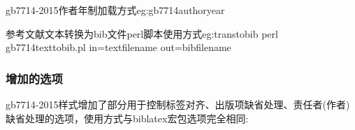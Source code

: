 \begin{codetex}{gb7714-2015作者年制加载方式}{eg:gb7714authoryear}
\usepackage[backend=biber,style=gb7714-2015ay]{biblatex}
\usepackage[backend=biber,style=gb7714-2015ay,gbpub=true,gbnoauthor=true]{biblatex}
\end{codetex}

\begin{codetex}{参考文献文本转换为bib文件perl脚本使用方式}{eg:transtobib}
perl gb7714texttobib.pl in=textfilename out=bibfilename
\end{codetex}

\subsubsection{增加的选项}\label{sec:added:opt}
gb7714-2015样式增加了部分用于控制标签对齐、出版项缺省处理、责任者(作者)缺省处理的选项，使用方式与biblatex宏包选项完全相同:
